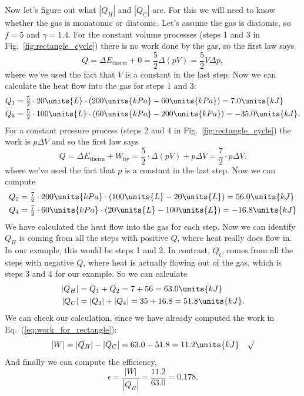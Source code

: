 Now let's figure out what $|Q_H|$ and $|Q_C|$ are.  For this we will
need to know whether the gas is monatomic or diatomic.  Let's assume
the gas is diatomic, so $f=5$ and $\gamma=1.4$.  For the constant
volume processes (steps 1 and 3 in Fig.~\ref{fig:rectangle_cycle})
there is no work done by the gas, so the first law says
\begin{equation}
 Q = \Delta E_\text{therm}+ 0 = {\textstyle\frac{5}{2}} \Delta(pV)
 = \textstyle{\frac{5}{2}} V\Delta p,
\end{equation}
where we've used the fact that $V$ is a constant in the last step.
Now we can calculate the heat flow into the gas for steps 1 and 3:
\begin{align}
Q_1 &= {\textstyle\frac{5}{2}}\cdot  20\units{L}\cdot (200\units{kPa}-60\units{kPa}) =
7.0\units{kJ}\nonumber\\
Q_3 &= {\textstyle\frac{5}{2}}\cdot  100\units{L} \cdot (60\units{kPa}-200\units{kPa}) =
-35.0\units{kJ}.
\end{align}
For a constant pressure process (steps 2 and 4 in
Fig.~\ref{fig:rectangle_cycle}) the work is $p\Delta V$ and so the
first law says
\begin{equation}
Q = \Delta E_\text{therm}+ W_\text{by} = {\textstyle\frac{5}{2}}\cdot \Delta(pV) +
p\Delta V = {\textstyle\frac{7}{2}}\cdot  p\Delta V.
\end{equation}
where we've used the fact that $p$ is a constant in the last step.
Now we can compute
\begin{align}
Q_2 &= {\textstyle\frac{7}{2}}\cdot  200\units{kPa}\cdot (100\units{L} - 20\units{L})
 = 56.0\units{kJ} \nonumber\\
Q_4 &= {\textstyle\frac{7}{2}}\cdot 60\units{kPa}\cdot (20\units{L} - 100\units{L})
 = -16.8\units{kJ} 
\end{align}
We have calculated the heat flow into the gas for each step.  Now we
can identify $Q_H$ is coming from all the steps with positive $Q$,
where heat really does flow in.  In our example, this would be steps 1
and 2.  In contrast, $Q_C$ comes from all the steps with negative $Q$,
where heat is actually flowing out of the gas, which is steps 3 and 4
for our example.  So we can calculate
\begin{align}
|Q_H| &= Q_1 + Q_2 = 7 + 56 = 63.0\units{kJ} \nonumber\\
|Q_C| &= |Q_3| + |Q_4| = 35 + 16.8 = 51.8\units{kJ}.
\end{align}
We can check our calculation, since we have already computed the work
in Eq.~(\ref{eq:work_for_rectangle}):
\begin{equation}
|W| = |Q_H|-|Q_C| = 63.0 - 51.8 = 11.2\units{kJ} \quad \surd
\end{equation}
And finally we can compute the efficiency,
\begin{equation}
\epsilon = \frac{|W|}{|Q_H|} = \frac{11.2}{63.0} = 0.178.
\end{equation}

